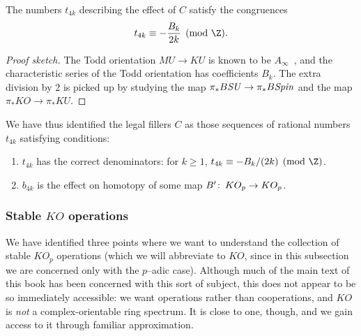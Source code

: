 \begin{corollary}
The numbers \(t_{4k}\) describing the effect of \(C\) satisfy the congruences \[t_{4k} \equiv -\frac{B_k}{2k} \pmod{\Z}.\]
\end{corollary}
\begin{proof}[Proof sketch]
The Todd orientation \(MU \to KU\) is known to be \(A_\infty\)~\cite[Theorem V.4.1]{EKMM}, and the characteristic series of the Todd orientation has coefficients \(B_k\).  The extra division by \(2\) is picked up by studying the map \(\pi_* B\mathit{SU} \to \pi_* B\mathit{Spin}\) and the map \(\pi_* KO \to \pi_* KU\).
\end{proof}

We have thus identified the legal fillers \(C\) as those sequences of rational numbers \(t_{4k}\) satisfying conditions:
\begin{enumerate}
    \item \(t_{4k}\) has the correct denominators: for \(k \ge 1\), \(t_{4k} \equiv -B_k/(2k) \pmod{\Z}\).
    \item \(b_{4k}\) is the effect on homotopy of some map \(B'\colon\thinspace KO_p \to KO_p\).
\end{enumerate}


\subsubsection{Stable \(KO\) operations}
\newcommand{\cts}{\mathrm{cts}}

We have identified three points where we want to understand the collection of stable \(KO_p\) operations (which we will abbreviate to \(KO\), since in this subsection we are concerned only with the \(p\)--adic case).  Although much of the main text of this book has been concerned with this sort of subject, this does not appear to be so immediately accessible: we want operations rather than cooperations, and \(KO\) is \emph{not} a complex-orientable ring spectrum.  It is close to one, though, and we gain access to it through familiar approximation.

